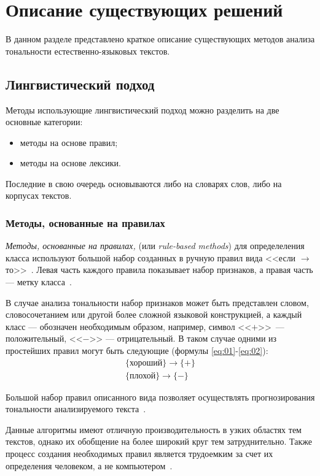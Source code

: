 \chapter{Описание существующих решений}

В данном разделе представлено краткое описание существующих методов анализа
тональности естественно-языковых текстов.

\section{Лингвистический подход}

Методы использующие лингвистический подход можно разделить на две основные
категории:
\begin{itemize}
    \item методы на основе правил;
    \item методы на основе лексики.
\end{itemize}

Последние в свою очередь основываются либо на словарях слов, либо на корпусах
текстов.

\subsection{Методы, основанные на правилах}

\textit{Методы, основанные на правилах,} (или \textit{rule-based methods}) для
определеления класса используют большой набор созданных в ручную правил
вида <<если $\rightarrow$ то>>~\cite{article14}. Левая часть каждого правила
показывает набор признаков, а правая часть --- метку класса~\cite{article2}.

В случае анализа тональности набор признаков может быть представлен словом,
словосочетанием или другой более сложной языковой конструкцией, а каждый класс
--- обозначен необходимым образом, например, символ <<$+$>>\ --- положительный,
<<$-$>> --- отрицательный. В таком случае одними из простейших
правил могут быть следующие (формулы \ref{eq:01}-\ref{eq:02}):
\begin{eqnarray}
    \{\text{хороший}\} \rightarrow \{+\}\label{eq:01}\\
    \{\text{плохой}\} \rightarrow \{-\}\label{eq:02}
\end{eqnarray}

Большой набор правил описанного вида позволяет осуществлять
прогнозирования тональности анализируемого текста~\cite{article16}.

Данные алгоритмы имеют отличную производительность в узких
областях тем текстов, однако их обобщение на более широкий круг тем
затруднительно. Также процесс создания необходимых правил является
трудоемким за счет их определения человеком, а не компьютером~\cite{article15}.

